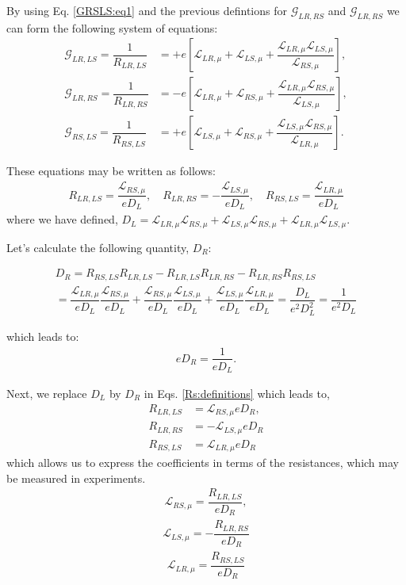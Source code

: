 By using Eq. \eqref{GRSLS:eq1} and the previous defintions for $\mathcal{G}_{LR,RS}$ and $\mathcal{G}_{LR,RS}$ we can form the following system of equations:
\begin{align*}
\mathcal{G}_{LR,LS}=\dfrac{1}{{R}_{LR,LS}}
&=
+e\left[\mathcal{L}_{LR,\mu} + \mathcal{L}_{LS,\mu} +\dfrac{\mathcal{L}_{LR,\mu} \mathcal{L}_{LS,\mu}}{\mathcal{L}_{RS,\mu}}\right],
\\
\mathcal{G}_{LR,RS}=\dfrac{1}{{R}_{LR,RS}}
&=
-e\left[\mathcal{L}_{LR,\mu}
+\mathcal{L}_{RS,\mu}+\dfrac{
\mathcal{L}_{LR,\mu} \mathcal{L}_{RS,\mu} }{\mathcal{L}_{LS,\mu}}\right],
\\
\mathcal{G}_{RS,LS}=\dfrac{1}{{R}_{RS,LS}}&=
+e\left[\mathcal{L}_{LS,\mu}+\mathcal{L}_{RS,\mu}+\dfrac{\mathcal{L}_{LS,\mu} \mathcal{L}_{RS,\mu}}{\mathcal{L}_{LR,\mu}}\right].
\end{align*}

These equations may be written as follows:
\begin{align}\label{Rs:definitions}
R_{LR,LS}
=
\dfrac{\mathcal{L}_{RS,\mu}}{eD_{L}},
\quad
R_{LR,RS}=-\dfrac{\mathcal{L}_{LS,\mu}}{eD_{L}},
\quad
R_{RS,LS}=\dfrac{\mathcal{L}_{LR,\mu}}{eD_{L}}
\end{align}
where we have defined,
$D_{L}=\mathcal{L}_{LR,\mu}\mathcal{L}_{RS,\mu} + \mathcal{L}_{LS,\mu}\mathcal{L}_{RS,\mu} +\mathcal{L}_{LR,\mu}\mathcal{L}_{LS,\mu}$.

Let's calculate the following quantity, $D_{R}$:
\begin{widetext}
\begin{multline}\label{DR:def}
D_{R}=R_{RS,LS}R_{LR,LS}
-
R_{LR,LS}R_{LR,RS}
-
R_{LR,RS}R_{RS,LS}
\\=
\dfrac{\mathcal{L}_{LR,\mu}}{eD_{L}}
\dfrac{\mathcal{L}_{RS,\mu}}{eD_{L}}
+
\dfrac{\mathcal{L}_{RS,\mu}}{eD_{L}}
\dfrac{\mathcal{L}_{LS,\mu}}{eD_{L}}
+
\dfrac{\mathcal{L}_{LS,\mu}}{eD_{L}}
\dfrac{\mathcal{L}_{LR,\mu}}{eD_{L}}
=
\dfrac{D_{L}}{e^{2}D^{2}_{L}}=\dfrac{1}{e^{2}D_{L}}
\end{multline}
\end{widetext}
which leads to:
\begin{align}\label{DR:def:2}
eD_{R}=\dfrac{1}{eD_{L}}.
\end{align}

Next, we replace $D_{L}$ by $D_{R}$ in Eqs. \eqref{Rs:definitions} which leads to,
\begin{align*}
R_{LR,LS}
&=
\mathcal{L}_{RS,\mu}eD_{R},
\\
R_{LR,RS}
&=-\mathcal{L}_{LS,\mu}eD_{R}
\\
R_{RS,LS}
&=\mathcal{L}_{LR,\mu}eD_{R}
\end{align*}
which allows us to express the coefficients in terms of the resistances, which may be measured in experiments. 
\begin{align}\label{LRS:exp}
\mathcal{L}_{RS,\mu}=\dfrac{R_{LR,LS}}{eD_{R}},
\end{align}
\begin{align}\label{LLS:exp}
\mathcal{L}_{LS,\mu}=-\dfrac{R_{LR,RS}}{eD_{R}}
\end{align}
\begin{align}\label{LLR:exp}
\mathcal{L}_{LR,\mu}=\dfrac{R_{RS,LS}}{eD_{R}}
\end{align}

